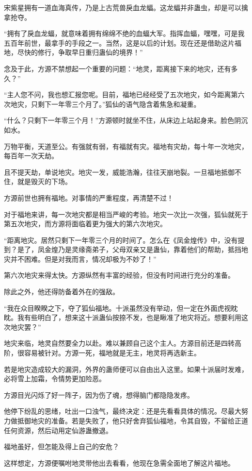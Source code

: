 \begin{this_body}
宋紫星拥有一道血海真传，乃是上古荒兽戾血龙蝠。这龙蝠并非蛊虫，却是可以擒拿抢夺。

“拥有了戾血龙蝠，就意味着拥有绵绵不绝的血蝠大军。指挥血蝠，嘿嘿，可是我五百年前世，最拿手的手段之一。当然，这是以后的计划。现在还是借助这片福地，尽快的修行，争取早日重归蛊仙的境界！”

念及于此，方源不禁想起一个重要的问题：“地灵，距离接下来的地灾，还有多久？”

“主人您不问，我也想汇报您呢。目前，福地已经经受了五次地灾，如今距离第六次地灾，只剩下一年零三个月了。”狐仙的语气隐含着焦急和凝重。

“什么？只剩下一年零三个月！”方源顿时就坐不住，从床边上站起身来。脸色阴沉如水。

万物平衡，天道至公。有强就有弱，有福就有灾。福地有灾劫，每十年一次地灾，每百年一次天劫。

且不提天劫，单说地灾。地灾一发，威能浩瀚，往往天崩地裂。一旦福地抵御不住，就是毁灭的下场。

方源前世也拥有福地。对事情的严重程度，再清楚不过！

对于福地来讲，每一次地灾都是相当严峻的考验。地灾一次比一次强，狐仙就死于第五次地灾，而方源将面临着更为强大的第六次地灾。

“距离地灾。居然只剩下一年零三个月的时间了。怎么在《凤金煌传》中，没有提到？是了，凤金煌乃是灵缘斋弟子，父母双亲又是蛊仙，靠着他们的帮助，抵挡地灾并不困难。但是对我而言，情况却极为不妙了！”

第六次地灾来得太快。方源纵然有丰富的经验，但没有时间进行充分的准备。

除此之外，他还得防备着外在的强敌。

“我在众目睽睽之下，夺了狐仙福地。十派虽然没有举动，但一定在外面虎视眈眈。我有些明白了，想来这十派蛊仙按捺不发，也是瞅准了地灾将近。想要利用这次地灾罢？”

地灾来临，地灵自然要全力以赴。难以兼顾自己这个主人。方源目前还是四转高阶，很容易被针对。方源一死，福地就是无主，地灵将再选新主。

若是地灾造成较大的漏洞，外界的蛊师便可以自由出入这里。如果十派届时发难，必将雪上加霜，令情势更加险恶。

方源目光闪烁了好一阵子，因为伤了魂，想得脑门都隐隐发疼。

他停下纷乱的思绪，吐出一口浊气，最终决定：还是先看看具体的情况。尽最大努力做抵御地灾的准备。若是失败了，他只好舍弃狐仙福地，令其自毁，不留给正道任何资源，然后动用定仙游蛊撤退。

福地虽好，但怎能及得上自己的安危？

这样想定，方源便嘱咐地灵带他出去看看，他现在急需全面地了解这片福地。


\end{this_body}
